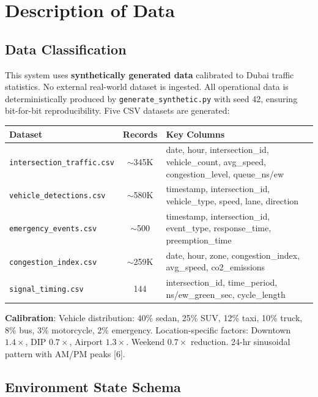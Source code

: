 \documentclass[11pt, a4paper]{article}
\begin{document}
\section{Description of Data}

\subsection{Data Classification}

This system uses \textbf{synthetically generated data} calibrated to Dubai traffic statistics. No external real-world dataset is ingested. All operational data is deterministically produced by \texttt{generate\_synthetic.py} with seed 42, ensuring bit-for-bit reproducibility. Five CSV datasets are generated:

\begin{table}[H]
\centering
\small
\begin{tabularx}{\textwidth}{lcX}
    \toprule
    \textbf{Dataset} & \textbf{Records} & \textbf{Key Columns} \\
    \midrule
    \texttt{intersection\_traffic.csv} & $\sim$345K & date, hour, intersection\_id, vehicle\_count, avg\_speed, congestion\_level, queue\_ns/ew \\
    \texttt{vehicle\_detections.csv} & $\sim$580K & timestamp, intersection\_id, vehicle\_type, speed, lane, direction \\
    \texttt{emergency\_events.csv} & $\sim$500 & timestamp, intersection\_id, event\_type, response\_time, preemption\_time \\
    \texttt{congestion\_index.csv} & $\sim$259K & date, hour, zone, congestion\_index, avg\_speed, co2\_emissions \\
    \texttt{signal\_timing.csv} & 144 & intersection\_id, time\_period, ns/ew\_green\_sec, cycle\_length \\
    \bottomrule
\end{tabularx}
\end{table}

\textbf{Calibration}: Vehicle distribution: 40\% sedan, 25\% SUV, 12\% taxi, 10\% truck, 8\% bus, 3\% motorcycle, 2\% emergency. Location-specific factors: Downtown $1.4\times$, DIP $0.7\times$, Airport $1.3\times$. Weekend $0.7\times$ reduction. 24-hr sinusoidal pattern with AM/PM peaks [6].

\subsection{Environment State Schema}
\end{document}
